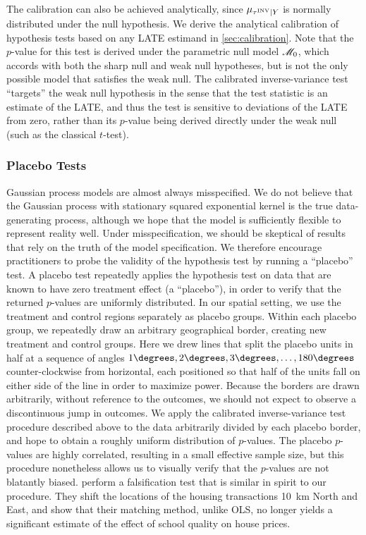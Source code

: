 The calibration can also be achieved analytically, since \(\mu_{\tau^{\mathrm{INV}} \mid Y}\) is normally distributed under the null hypothesis.
We derive the analytical calibration of hypothesis tests based on any LATE estimand in \autoref{sec:calibration}.
Note that the \(p\)-value for this test is derived under the parametric null model \(\mathscr{M}_0\), which accords with both the sharp null and weak null hypotheses, but is not the only possible model that satisfies the weak null.
The calibrated inverse-variance test “targets” the weak null hypothesis in the sense that the test statistic is an estimate of the LATE, and thus the test is sensitive to deviations of the LATE from zero, rather than its \(p\)-value being derived directly under the weak null (such as the classical \(t\)-test).


\subsubsection{Placebo Tests}
\label{sec:placebo}
Gaussian process models are almost always misspecified.
We do not believe that the Gaussian process with stationary squared exponential kernel is the true data-generating process, although we hope that the model is sufficiently flexible to represent reality well.
Under misspecification, we should be skeptical of results that rely on the truth of the model specification.
We therefore encourage practitioners to probe the validity of the hypothesis test by running a ``placebo'' test.
A placebo test repeatedly applies the hypothesis test on data that are known to have zero treatment effect (a ``placebo''),
in order to verify that the returned \(p\)-values are uniformly distributed.
In our spatial setting, we use the treatment and control regions separately as placebo groups.
Within each placebo group, we repeatedly draw an arbitrary geographical border, creating new treatment and control groups.
Here we drew lines that split the placebo units in half at a sequence of angles \(1\degrees,2\degrees,3\degrees,\dotsc,180\degrees\) counter-clockwise from horizontal, each positioned so that half of the units fall on either side of the line in order to maximize power.
Because the borders are drawn arbitrarily, without reference to the outcomes, we should not expect to observe a discontinuous jump in outcomes.
We apply the calibrated inverse-variance test procedure described above to the data arbitrarily divided by each placebo border, and hope to obtain a roughly uniform distribution of \(p\)-values.
The placebo \(p\)-values are highly correlated, resulting in a small effective sample size, but this procedure nonetheless allows us to visually verify that the \(p\)-values are not blatantly biased.
\citet{gibbons2013valuing} perform a falsification test that is similar in spirit to our procedure. They shift the locations of the housing transactions 10~km North and East, and show that their matching method, unlike OLS, no longer yields a significant estimate of the effect of school quality on house prices.

